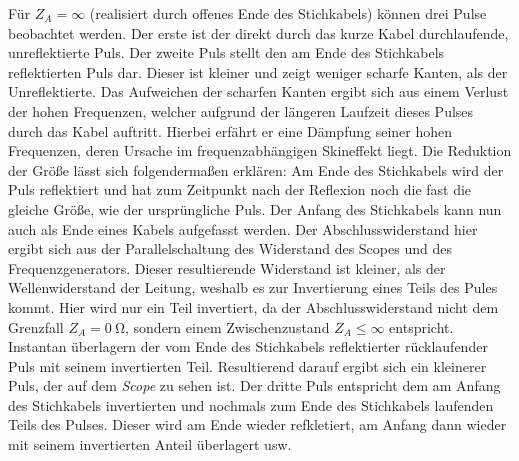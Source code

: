 \documentclass[a4paper,twoside,final]{article}
\begin{document}
Für $Z_A = \infty$ (realisiert durch offenes Ende des Stichkabels) können drei Pulse beobachtet werden. Der erste ist der direkt durch das kurze Kabel durchlaufende, unreflektierte Puls. Der zweite Puls stellt den am Ende des Stichkabels reflektierten Puls dar. Dieser ist kleiner und zeigt weniger scharfe Kanten, als der Unreflektierte. Das Aufweichen der scharfen Kanten ergibt sich aus einem Verlust der hohen Frequenzen, welcher aufgrund der längeren Laufzeit dieses Pulses durch das Kabel auftritt. Hierbei erfährt er eine Dämpfung seiner hohen Frequenzen, deren Ursache im frequenzabhängigen Skineffekt liegt. Die Reduktion der Größe lässt sich folgendermaßen erklären: Am Ende des Stichkabels wird der Puls reflektiert und hat zum Zeitpunkt nach der Reflexion noch die fast die gleiche Größe, wie der ursprüngliche Puls. Der Anfang des Stichkabels kann nun auch als Ende eines Kabels aufgefasst werden. Der Abschlusswiderstand hier ergibt sich aus der Parallelschaltung des Widerstand des Scopes und des Frequenzgenerators. Dieser resultierende Widerstand ist kleiner, als der Wellenwiderstand der Leitung, weshalb es zur Invertierung eines Teils des Pules kommt. Hier wird nur ein Teil invertiert, da der Abschlusswiderstand nicht dem Grenzfall $Z_A = \SI{0}{\ohm}$, sondern einem Zwischenzustand $Z_A \leq \infty$ entspricht. Instantan überlagern der vom Ende des Stichkabels reflektierter rücklaufender Puls mit seinem invertierten Teil. Resultierend darauf ergibt sich ein kleinerer Puls, der auf dem \textit{Scope} zu sehen ist. Der dritte Puls entspricht dem am Anfang des Stichkabels invertierten und nochmals zum Ende des Stichkabels laufenden Teils des Pulses. Dieser wird am Ende wieder refkletiert, am Anfang dann wieder mit seinem invertierten Anteil überlagert usw.
\end{document}
